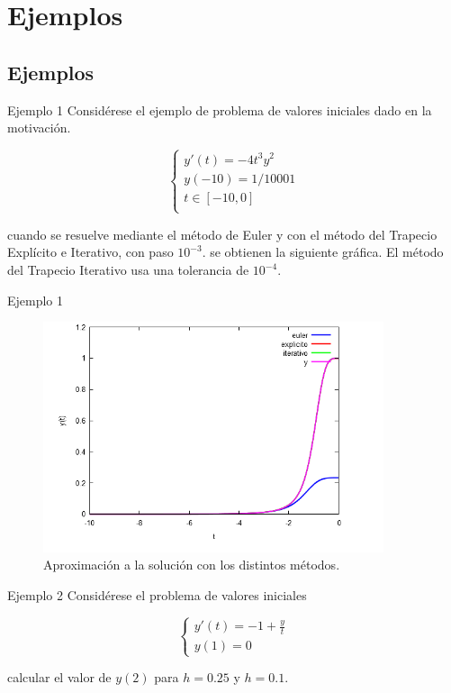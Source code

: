 \section{Ejemplos} \label{ejemplos}

\subsection{Ejemplos} \label{ejemplo1}
		\begin{frame}{Ejemplo 1}
			Considérese el ejemplo de problema de valores iniciales dado en la motivación.

			\begin{equation*}
			\begin{cases}
			y'(t) = -4 t^3 y^2 \\
			y(-10) = 1/10001 \\
			t \in [-10,0] \\
			\end{cases}
			\end{equation*}

			cuando se resuelve mediante el método de Euler y con el método del Trapecio Explícito e Iterativo, con paso $10^{-3}$. se obtienen la siguiente gráfica. El método del Trapecio Iterativo usa una tolerancia de $10^{-4}$.
		\end{frame}


		\begin{frame}{Ejemplo 1}	
			\begin{figure}[h]
				\centering
				\includegraphics[width=10cm]{./Images/ej1.png}
				\caption{Aproximación a la solución con los distintos métodos.}
			\end{figure}
		\end{frame}	
		
		
		\begin{frame}{Ejemplo 2}
			Considérese el problema de valores iniciales
			
			\begin{equation*}
			\begin{cases}
			y'(t) = -1 + \frac{y}{t} \\
			y(1) = 0
			\end{cases}
			\end{equation*}
			
			calcular el valor de $y(2)$ para $h=0.25$ y $h=0.1$.			
		\end{frame}
		
